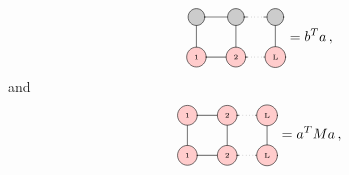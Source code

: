 \documentclass[twoside,twocolumn,9pt]{article}
\begin{document}
\begin{equation}
  \begin{tikzpicture}[baseline={([yshift=-.5ex]current bounding box.center)}]
    \draw[gray, thick] (0,0) -- (0,-1);
    \draw[gray, thick] (1,0) -- (1,-1);
    \draw[gray, thick] (2,0) -- (2,-1);

    \draw[gray, thick] (0,0) -- (1.3,0);
    \draw[gray, dotted] (1.3,0) -- (1.7,0);
    \draw[gray, thick] (1.7,0) -- (2.0,0);

    \draw[gray, thick] (0,-1) -- (1.3,-1);
    \draw[gray, dotted] (1.3,-1) -- (1.7,-1);
    \draw[gray, thick] (1.7,-1) -- (2.0,-1);

    \node[draw, circle, line cap=round, fill=black!20, minimum size=12] at (0,0) {  };
    \node[draw, circle, line cap=round, fill=black!20, minimum size=12] at (1,0) {  };
    \node[draw, circle, line cap=round, fill=black!20, minimum size=12] at (2,0) {  };

    \node[draw, circle, line cap=round, fill=red!20] at (0,-1) {\tiny 1};
    \node[draw, circle, line cap=round, fill=red!20] at (1,-1) {\tiny 2};
    \node[draw, circle, line cap=round, fill=red!20] at (2,-1) {\tiny L};
  \end{tikzpicture} = b^T a \thinspace ,
\end{equation}
and
\begin{equation}
  \begin{tikzpicture}[baseline={([yshift=-.5ex]current bounding box.center)}]
    \draw[gray, thick] (0,0) -- (0,-1);
    \draw[gray, thick] (1,0) -- (1,-1);
    \draw[gray, thick] (2,0) -- (2,-1);
  
    \draw[gray, thick] (0,0) -- (1.3,0);
    \draw[gray, dotted] (1.3,0) -- (1.7,0);
    \draw[gray, thick] (1.7,0) -- (2.0,0);
  
    \draw[gray, thick] (0,-1) -- (1.3,-1);
    \draw[gray, dotted] (1.3,-1) -- (1.7,-1);
    \draw[gray, thick] (1.7,-1) -- (2.0,-1);
  
    \node[draw, circle, line cap=round, fill=red!20] at (0,0) {\tiny 1};
    \node[draw, circle, line cap=round, fill=red!20] at (1,0) {\tiny 2};
    \node[draw, circle, line cap=round, fill=red!20] at (2,0) {\tiny L};
  
    \node[draw, circle, line cap=round, fill=red!20] at (0,-1) {\tiny 1};
    \node[draw, circle, line cap=round, fill=red!20] at (1,-1) {\tiny 2};
    \node[draw, circle, line cap=round, fill=red!20] at (2,-1) {\tiny L};    
  \end{tikzpicture} = a^T M a \thinspace ,
\end{equation}
\end{document}
